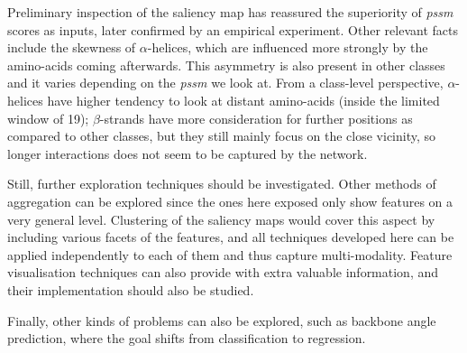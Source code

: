 Preliminary inspection of the saliency map has reassured the superiority of \textit{pssm} scores as inputs, later confirmed by an empirical experiment. Other relevant facts include the skewness of $\alpha$-helices, which are influenced more strongly by the amino-acids coming afterwards. This asymmetry is also present in other classes and it varies depending on the \textit{pssm} we look at. From a class-level perspective, $\alpha$-helices have higher tendency to look at distant amino-acids (inside the limited window of 19); $\beta$-strands have more consideration for further positions as compared to other classes, but they still mainly focus on the close vicinity, so longer interactions does not seem to be captured by the network.

Still, further exploration techniques should be investigated. Other methods of aggregation can be explored since the ones here exposed only show features on a very general level. Clustering of the saliency maps would cover this aspect by including various facets of the features, and all techniques developed here can be applied independently to each of them and thus capture multi-modality. Feature visualisation techniques can also provide with extra valuable information, and their implementation should also be studied.

Finally, other kinds of problems can also be explored, such as backbone angle prediction, where the goal shifts from classification to regression.